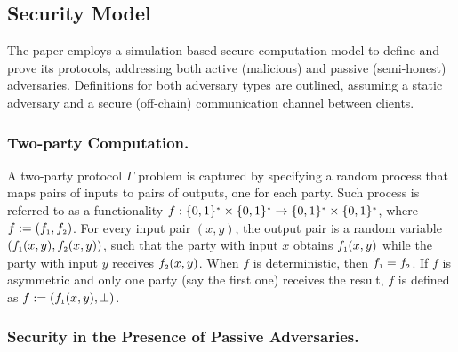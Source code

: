 

 
  
\vspace{-3mm}
\subsection{Security Model}\label{sec::sec-model}
\vspace{-1mm}


The paper employs a simulation-based secure computation model \cite{DBLP:books/cu/Goldreich2004} to define and prove its protocols, addressing both active (malicious) and passive (semi-honest) adversaries. Definitions for both adversary types are outlined, assuming a static adversary and a secure (off-chain) communication channel between clients.


%
 
  \vspace{-3mm}
  
 \subsubsection{Two-party Computation.} A two-party protocol $\Gamma$ problem is captured by specifying a random process that maps pairs of inputs to pairs of outputs, one for each party. Such process is referred to as a functionality  $f:\{0,1\}^{\scriptscriptstyle *}\times\{0,1\}^{\scriptscriptstyle *}\rightarrow\{0,1\}^{\scriptscriptstyle *}\times\{0,1\}^{\scriptscriptstyle *}$, where $f:=(f_{\scriptscriptstyle 1},f_{\scriptscriptstyle 2})$. For every input pair $(x,y)$, the output pair is a random variable $(f_{\scriptscriptstyle 1} (x,y), f_{\scriptscriptstyle 2} (x,y))$, such that the party with input $x$ obtains $f_{\scriptscriptstyle 1} (x,y)$ while the party with input $y$ receives $f_{\scriptscriptstyle 2} (x,y)$. When $f$ is deterministic, then $f_{\scriptscriptstyle 1} =f_{\scriptscriptstyle 2}$. If $f$ is asymmetric and only one party (say the first one) receives the result, $f$ is defined as $f:=(f_{\scriptscriptstyle 1}(x,y), \bot)$. 
 
  
  \vspace{-3mm}
 \subsubsection{Security in the Presence of Passive Adversaries.} 
 
